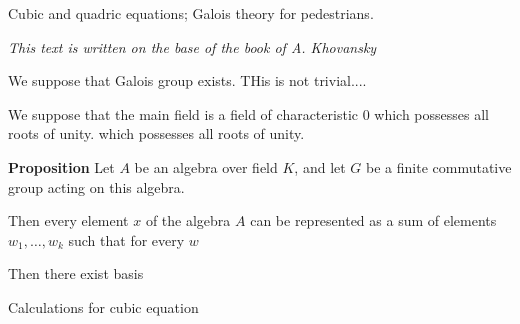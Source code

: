 



 \baselineskip=14pt


\def\p {\partial}
\def \D {\Delta_{d{\bf v}}}
\def \Ds  {\Delta^{\#}}
\def\t{\tilde}
\def\s {\sigma}
\def\vare {\varepsilon}
\def\L {\Lambda}
\def\Darboux {$z^A=$  $x^1,\dots,x^n$, $\theta_1,\dots,\theta_n$}
\def\a{\alpha}
\def\O{\Omega}
\def\d{\delta}
\def\dv  {{d{\bf{v}}}}
\def\A {{\cal A}}
\def\R {I\!R}
\def\t {\tilde}


             \centerline {Cubic and quadric equations; Galois theory for pedestrians.}

{\it This text is written on the base of the book of A. Khovansky}

 We suppose that Galois group exists. THis is not trivial.... 

   We suppose that the main field is a field of characteristic
   $0$ which possesses all roots of unity.
which possesses all roots of unity.

 {\bf Proposition} Let $A$ be an algebra over field $K$,
and let $G$ be a finite 
commutative group acting on this algebra.

  Then every element $x$ of the algebra $A$
can be represented as a sum of elements $w_1,\dots,w_k$
such that for every $w$

Then there exist 
 basis 











\centerline {Calculations for cubic equation}

